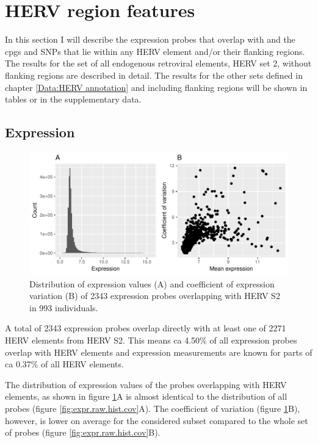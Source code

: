 \documentclass[a4paper,12pt,twoside,openright]{report}
\begin{document}
\section{HERV region features}
\label{Results:HERV region features}
In this section I will describe the expression probes that overlap with and the cpgs and SNPs that lie within any HERV element and/or their flanking regions. The results for the set of all endogenous retroviral elements, HERV set 2, without flanking regions are described in detail. The results for the other sets defined in chapter \ref{Data:HERV annotation} and including flanking regions will be shown in tables or in the supplementary data.

\subsection{Expression}
\label{Results:Expression}

\begin{figure}[tb]
	\includegraphics[scale = 1, keepaspectratio = true]{../figures/hervS2_expr_raw_hist_cov}  
	\caption{Distribution of expression values (A) and coefficient of expression variation (B) of 2343 expression probes overlapping with HERV S2 in 993 individuals.}
    \label{fig:hervS2.expr.hist.cov}
\end{figure}

A total of 2343 expression probes overlap directly with at least one of 2271 HERV elements from HERV S2. This means ca 4.50\% of all expression probes overlap with HERV elements and expression measurements are known for parts of ca 0.37\% of all HERV elements.

The distribution of expression values of the probes overlapping with HERV elements, as shown in figure \ref{fig:hervS2.expr.hist.cov}A is almost identical to the distribution of all probes (figure \ref{fig:expr.raw.hist.cov}A). The coefficient of variation (figure \ref{fig:hervS2.expr.hist.cov}B), however, is lower on average for the considered subset compared to the whole set of probes (figure \ref{fig:expr.raw.hist.cov}B).
\end{document}
